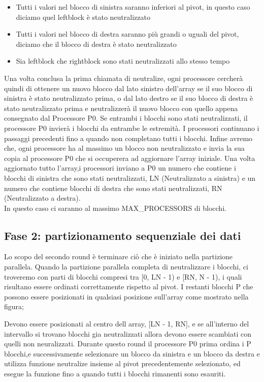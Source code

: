 \begin{itemize}
\item Tutti i valori nel blocco di sinistra saranno inferiori al pivot, in questo caso diciamo quel leftblock è stato neutralizzato
\item Tutti i valori nel blocco di destra saranno più grandi o uguali
del pivot, diciamo che il blocco di destra è stato neutralizzato
\item Sia leftblock che rightblock sono stati neutralizzati allo stesso
tempo
\end{itemize}
 
Una volta conclusa la prima chiamata di neutralize, ogni processore cercherà quindi di ottenere un nuovo blocco dal lato sinistro dell'array se il suo blocco di sinistra è stato neutralizzato prima, o dal lato destro se il suo blocco di destra è stato neutralizzato prima e neutralizzerà il nuovo blocco con quello appena consegnato dal Processore P0. Se entrambi i blocchi sono stati neutralizzati, il processore P0 invierà i blocchi da entrambe le estremità. I processori continuano i passaggi precedenti fino a quando non completano tutti i blocchi. Infine avremo che, ogni processore ha al massimo un blocco non neutralizzato
e invia la sua copia al processore P0 che si occuperera ad aggiornare l'array iniziale.
Una volta aggiornato tutto l'array,i processori inviano a P0 un numero che contiene i blocchi di sinistra che sono stati neutralizzati, LN (Neutralizzato a sinistra) e un numero che contiene blocchi di destra che sono stati neutralizzati, RN (Neutralizzato a destra).\\
In questo caso ci saranno al massimo MAX\_PROCESSORS di blocchi.

\subsection{Fase 2: partizionamento sequenziale dei dati} \label{subsect_Phase2}

Lo scopo del secondo round è terminare ciò che è iniziato nella partizione parallela.
Quando la partizione parallela completa di neutralizzare i blocchi, ci troveremo con parti di blocchi  compresi tra [0, LN - 1) e [RN, N - 1), i quali risultano essere ordinati correttamente rispetto al pivot. I restanti blocchi P che possono essere posizionati in qualsiasi posizione sull'array come mostrato nella figura;



Devono essere posizionati al centro dell array, [LN - 1, RN], e se all'interno del intervallo si trovano blocchi gia neutralizzati allora devono essere scambiati con quelli non neuralizzati. Durante questo  round il processore P0 prima ordina i P blocchi,e successivamente selezionare un blocco da sinistra e un blocco da destra e utilizza funzione neutralize insieme al pivot precedentemente selezionato, ed esegue la funzione fino a quando tutti i blocchi rimanenti sono esauriti.
 
